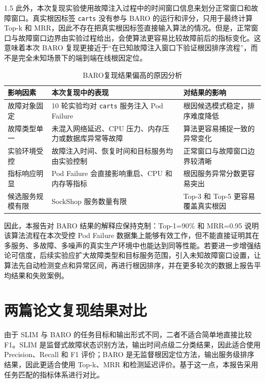 \documentclass[a4paper,12pt]{report}
\begin{document}
\begin{spacing}{1.5}
此外，本次复现实验使用故障注入过程中的时间窗口信息来划分正常窗口和故障窗口。真实根因标签 \texttt{carts} 没有参与 BARO 的运行和评分，只用于最终计算 Top-k 和 MRR，因此不存在把真实根因标签直接输入算法的情况。但是，正常窗口与故障窗口边界由实验过程给出，会使算法更容易比较故障前后的指标变化。这意味着本次 BARO 复现更接近于“在已知故障注入窗口下验证根因排序流程”，而不是完全未知场景下的端到端在线根因定位。

\begin{table}[H]
\centering
\caption{BARO复现结果偏高的原因分析}
\begin{tabular}{p{3.2cm}p{5.6cm}p{4.6cm}}
\toprule
\textbf{影响因素} & \textbf{本次复现中的表现} & \textbf{对结果的影响} \\
\midrule
故障对象固定 & 10 轮实验均对 \texttt{carts} 服务注入 Pod Failure & 根因候选模式稳定，排序难度降低 \\
故障类型单一 & 未混入网络延迟、CPU 压力、内存压力或数据库异常等故障 & 算法更容易捕捉一致的异常变化 \\
实验环境受控 & 故障注入时间、恢复时间和目标服务均由实验控制 & 正常窗口与故障窗口边界较清晰 \\
指标响应明显 & Pod Failure 会直接影响重启、CPU 和内存等指标 & 根因服务异常分数更容易突出 \\
候选服务规模有限 & SockShop 服务数量有限 & Top-3 和 Top-5 更容易覆盖真实根因 \\
\bottomrule
\end{tabular}
\end{table}

因此，本报告对 BARO 结果的解释应保持克制：Top-1=90\% 和 MRR=0.95 说明该算法流程在本次受控 Pod Failure 数据集上能够有效工作，但不能直接证明其在多服务、多故障、多噪声的真实生产环境中也能达到同等性能。若要进一步增强结论可信度，后续实验应扩大故障类型和目标服务范围，引入未知故障窗口设置，让算法先自动检测变点和异常区间，再进行根因排序，并在更多轮次的数据上报告平均结果和失败案例。

\section{两篇论文复现结果对比}

由于 SLIM 与 BARO 的任务目标和输出形式不同，二者不适合简单地直接比较 F1。SLIM 是监督式故障状态识别方法，输出时间点级二分类结果，因此适合使用 Precision、Recall 和 F1 评价；BARO 是无监督根因定位方法，输出服务级排序结果，因此更适合使用 Top-k、MRR 和检测延迟评价。基于这一点，本报告采用任务匹配的指标体系进行对比。


\end{spacing}
\end{document}
